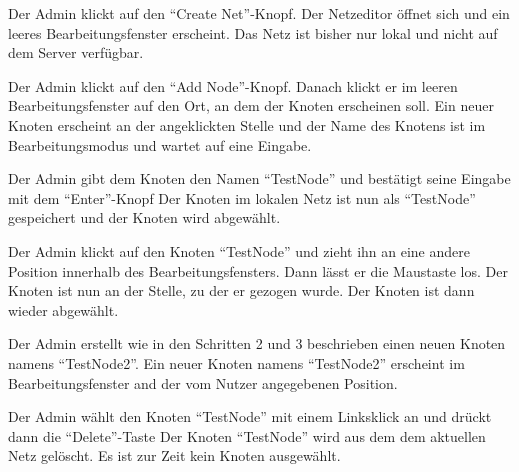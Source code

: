 \documentclass[parskip=full,11pt,twoside]{scrartcl}
\begin{document}
{Der Admin klickt auf den \enquote{Create Net}-Knopf.}
{Der Netzeditor öffnet sich und ein leeres Bearbeitungsfenster erscheint. Das Netz ist bisher nur lokal und nicht auf dem Server verfügbar.}

{Der Admin klickt auf den \enquote{Add Node}-Knopf. Danach klickt er im leeren Bearbeitungsfenster auf den Ort, an dem der Knoten erscheinen soll.} 
{Ein neuer Knoten erscheint an der angeklickten Stelle und der Name des Knotens ist im Bearbeitungsmodus und wartet auf eine Eingabe.}

{Der Admin gibt dem Knoten den Namen \enquote{TestNode} und bestätigt seine Eingabe mit dem \enquote{Enter}-Knopf}
{Der Knoten im lokalen Netz ist nun als \enquote{TestNode} gespeichert und der Knoten wird abgewählt.}

{Der Admin klickt auf den Knoten \enquote{TestNode} und zieht ihn an eine andere Position innerhalb des Bearbeitungsfensters. Dann lässt er die Maustaste los.}
{Der Knoten ist nun an der Stelle, zu der er gezogen wurde. Der Knoten ist dann wieder abgewählt.}

{Der Admin erstellt wie in den Schritten 2 und 3 beschrieben einen neuen Knoten namens \enquote{TestNode2}.}
{Ein neuer Knoten namens \enquote{TestNode2} erscheint im Bearbeitungsfenster and der vom Nutzer angegebenen Position.}

{Der Admin wählt den Knoten \enquote{TestNode} mit einem Linksklick an und drückt dann die \enquote{Delete}-Taste}
{Der Knoten \enquote{TestNode} wird aus dem dem aktuellen Netz gelöscht. Es ist zur Zeit kein Knoten ausgewählt.}
\end{document}
